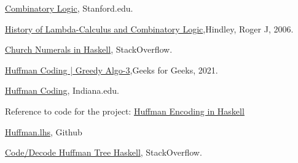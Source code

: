 \documentclass{article}
\begin{document}
\begin{thebibliography}{99}
 \href{https://plato.stanford.edu/entries/logic-combinatory/}{Combinatory Logic}, Stanford.edu.

 \href{https://www.researchgate.net/publication/228386842_History_of_lambda-calculus_and_combinatory_logic}{History of Lambda-Calculus and Combinatory Logic},Hindley, Roger J, 2006.

 \href{https://stackoverflow.com/questions/6462749/church-numerals-in-haskell}{Church Numerals in Haskell}, StackOverflow.

 \href{https://www.geeksforgeeks.org/huffman-coding-greedy-algo-3/}{Huffman Coding | Greedy Algo-3},Geeks for Geeks, 2021.

 \href{https://cgi.luddy.indiana.edu/~yye/c343-2019/huffman.php}{Huffman Coding}, Indiana.edu.

Reference to code for the project:
 \href{https://ryanriddle.github.io/haskell-huffman.html}{Huffman Encoding in Haskell}

 \href{https://gist.github.com/kirelagin/3886243}{Huffman.lhs}, Github

 \href{https://stackoverflow.com/questions/51865369/code-decode-huffman-tree-haskell}{Code/Decode Huffman Tree Haskell}, StackOverflow.


\end{thebibliography}
\end{document}
